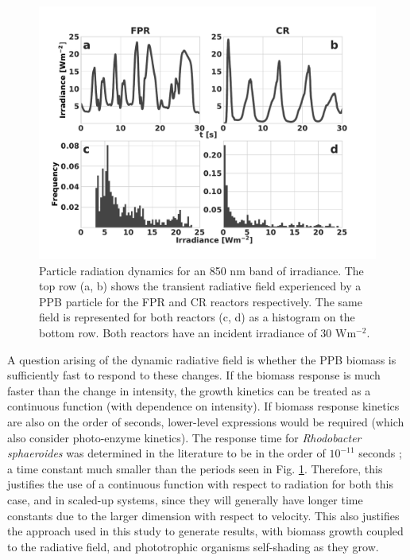 \begin{figure}[tp]
\centering
\includegraphics[width=1.\linewidth]{Images/Chap3/G850_short.pdf}
\caption{Particle radiation dynamics for an 850 nm band of irradiance. The top row (a, b) shows the transient radiative field experienced by a PPB particle for the FPR and CR reactors respectively. The same field is represented for both reactors (c, d) as a histogram on the bottom row. Both reactors have an incident irradiance of 30 $\mathrm{ W m^{-2}}$.}
\label{fig:G850_short}
\end{figure}

A question arising of the dynamic radiative field is whether the PPB biomass is sufficiently fast to respond to these changes. If the biomass response is much faster than the change in intensity, the growth kinetics can be treated as a continuous function (with dependence on intensity). If biomass response kinetics are also on the order of seconds, lower-level expressions would be required (which also consider photo-enzyme kinetics). The response time for \textit{Rhodobacter sphaeroides} was determined in the literature to be in the order of $10^{-11}$ seconds \cite{slouf2012}; a time constant much smaller than the periods seen in Fig. \ref{fig:G850_short}. Therefore, this justifies the use of a continuous function with respect to radiation for both this case, and in scaled-up systems, since they will generally have longer time constants due to the larger dimension with respect to velocity. This also justifies the approach used in this study to generate results, with biomass growth coupled to the radiative field, and phototrophic organisms self-shading as they grow.

